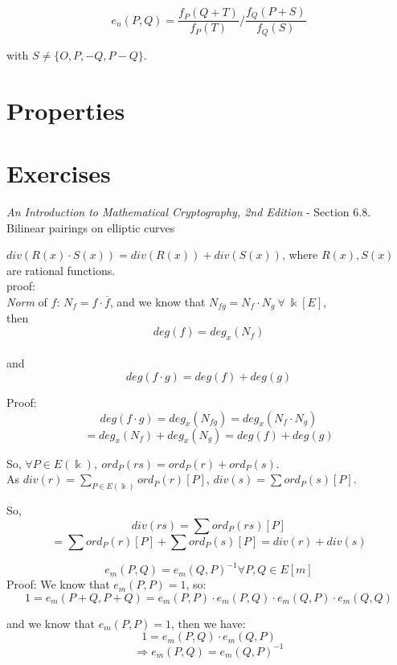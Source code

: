 \documentclass{article}
\theoremstyle{definition}
\newenvironment{solution}[1]
{\renewcommand\theinnersolution{#1}\innersolution}
{\endinnersolution}
\begin{document}
$$
e_n(P, Q) = \frac{f_P(Q+T)}{f_P(T)} / \frac{f_Q(P+S)}{f_Q(S)}
$$

with $S \neq \{O, P, -Q, P-Q \}$.


\section{Properties}


\section{Exercises}
\emph{An Introduction to Mathematical Cryptography, 2nd Edition} - Section 6.8. Bilinear pairings on elliptic curves

\begin{solution}{6.29}
  $div(R(x) \cdot S(x)) = div( R(x)) + div( S(x))$, where $R(x), S(x)$ are rational functions.
  \\proof:\\
  \emph{Norm} of $f$: $N_f = f \cdot \overline{f}$, and we know that $N_{fg} = N_f \cdot N_g~\forall~\Bbbk[E]$,\\
  then $$deg(f) = deg_x(N_f)$$\\
  and $$deg(f \cdot g) = deg(f) + deg(g)$$

  Proof:
  $$deg(f \cdot g) = deg_x(N_{fg}) = deg_x(N_f \cdot N_g)$$
  $$= deg_x(N_f) + deg_x(N_g) = deg(f) + deg(g)$$

  So, $\forall P \in E(\Bbbk),~ ord_P(rs) = ord_P(r) + ord_P(s)$.\\
  As $div(r) = \sum_{P\in E(\Bbbk)} ord_P(r)[P]$, $div(s) = \sum ord_P(s)[P]$.

  So,
  $$div(rs) = \sum ord_P(rs)[P]$$
  $$= \sum ord_P(r)[P] + \sum ord_P(s)[P] = div(r) + div(s)$$
\end{solution}

\vspace{0.5cm}

\begin{solution}{6.31}
  $$e_m(P, Q) = e_m(Q, P)^{-1} \forall P, Q \in E[m]$$
  Proof:
  We know that $e_m(P, P) = 1$, so:
  $$1 = e_m(P+Q, P+Q) = e_m(P, P) \cdot e_m(P, Q) \cdot e_m(Q, P) \cdot e_m(Q, Q)$$

  and we know that $e_m(P, P) = 1$, then we have:
  $$1 = e_m(P, Q) \cdot e_m(Q, P)$$
  $$\Longrightarrow e_m(P, Q) = e_m(Q, P)^{-1}$$
\end{solution}
\end{document}
